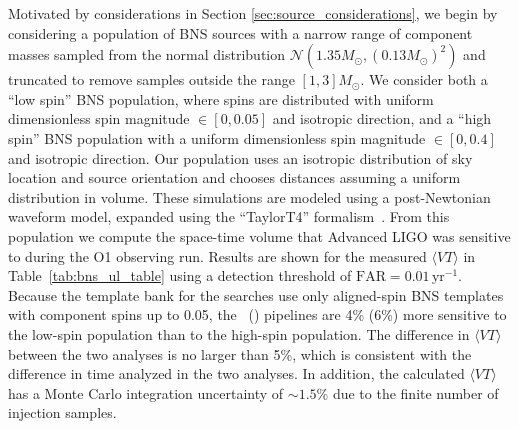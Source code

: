 Motivated by considerations in Section \ref{sec:source_considerations}, we begin by
considering a population of \ac{BNS} sources with a narrow range of component
masses sampled from the normal distribution $\mathcal{N}(1.35M_\odot, (0.13M_\odot)^2)$
and truncated to remove samples outside the range $[1,3] M_{\odot}$. We consider
both a ``low spin'' \ac{BNS} population, where spins are distributed with uniform dimensionless
spin magnitude $\in [0, 0.05]$ and isotropic direction, and a ``high spin'' \ac{BNS}
population with a uniform dimensionless spin magnitude $\in [0, 0.4]$ and isotropic direction.
Our population uses an isotropic distribution of sky location and source orientation and chooses
distances assuming a uniform distribution in volume.
These simulations are modeled using a post-Newtonian waveform model, expanded using the
``TaylorT4'' formalism~\citep{Buonanno:2009zt}.
From this population we compute the space-time volume that Advanced \ac{LIGO} was
sensitive to during the O1 observing run. Results are shown for the measured $\langle VT\rangle$
in Table~\ref{tab:bns_ul_table} using a detection threshold of $\mathrm{FAR} = 0.01\, \mathrm{yr}^{-1}$.
Because the template bank for the searches use only aligned-spin \ac{BNS} templates with 
component spins up to 0.05, the \pycbc\ (\gstlal) pipelines are 4\% (6\%) more sensitive 
to the low-spin population than to the high-spin population.
The difference in $\langle VT\rangle$ between the two analyses is no larger than 5\%, which
is consistent with the difference in time analyzed in the two analyses. 
In addition, the calculated $\langle VT \rangle$
has a Monte Carlo integration uncertainty of $\sim1.5\%$ due to the finite number of injection
samples.

